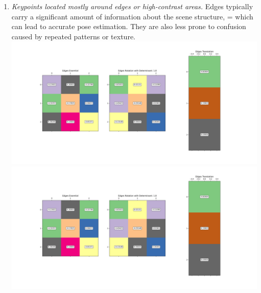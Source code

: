 \documentclass[11pt]{article}
\begin{document}
\begin{itemize}
\begin{enumerate}
            \item \textit{Keypoints located mostly around edges or high-contrast areas.}\newline
            Edges typically carry a significant amount of information about the scene structure, =
            which can lead to accurate pose estimation. They are also less prone to confusion caused by
            repeated patterns or texture.\newline
            \includegraphics[width=\textwidth]{Output Pictures/Edges Lines}\newline
            \includegraphics[width=\textwidth]{Output Pictures/Edges Matrices}\newline


\end{enumerate}
\end{itemize}
\end{document}
